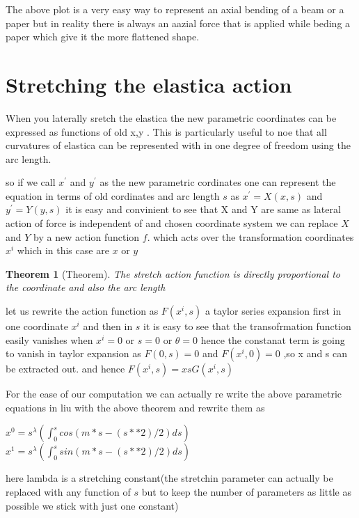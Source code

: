 \documentclass[longbibliography]{revtex4-1}
\begin{document}

The above plot is a very easy way to represent an axial bending of a beam or a paper but in reality there is always an aazial force that is applied while beding a paper which give it the more flattened shape.

\section{Stretching the elastica action}
When you laterally sretch the elastica the new parametric coordinates can be expressed as functions of old x,y . This is particularly useful to noe that all curvatures of elastica can be represented with in one degree of freedom using the arc length.

so if we call $x^{'}$ and $y^{'}$ as the new parametric cordinates one can represent the equation in terms of old cordinates and arc length $s$ as $x^{'} =  X(x,s)$ and $y^{'} = Y(y,s)$ it is easy and convinient to see that X and Y are same as lateral action of force is independent of and chosen coordinate system  we can replace $X$ and $Y$ by a new action function $f$. which acts over the transformation coordinates $x^{i}$ which in this case are $x$ or $y$

\newtheorem{thm}{Theorem}
\begin{thm}[Theorem]
The stretch action function is directly proportional to the coordinate and also the arc length
\end{thm}

let us rewrite the action function as $F(x^{i},s)$ a taylor series expansion first in one coordinate $x^{i}$ and then in $s$
it is easy to see that the transofrmation function easily vanishes when $x^{i}=0$ or $s=0$ or $\theta=0$
hence the constanat term is going to vanish in taylor expansion as $F(0,s)=0$ and $F(x^{i},0)=0$ ,so x and s can be extracted out.
and hence $F(x^{i},s) = xsG(x^{i},s)$

For the ease of our computation we can actually re write the above parametric equations in liu with the above theorem and rewrite them as

 $x^{0}= s^{\lambda} (\int_{0}^{s} cos(m*s-(s**2)/2) ds)$ 
 $x^{1}= s^{\lambda} (\int_{0}^{s} sin(m*s-(s**2)/2) ds)$ 

 here lambda is a stretching constant(the stretchin parameter can actually be replaced with any function of $s$ but to keep the number of parameters as little as possible we stick with just one constant)
\end{document}

